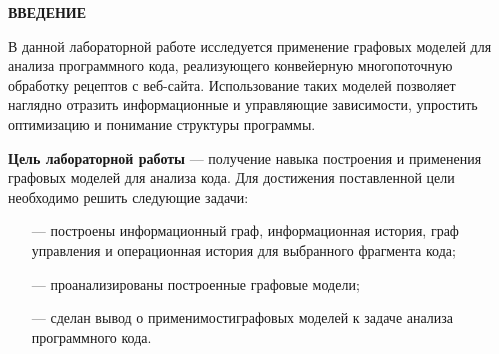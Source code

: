 \begin{center}
    \textbf{ВВЕДЕНИЕ}
\end{center}

В данной лабораторной работе исследуется применение графовых моделей для анализа программного кода, реализующего конвейерную многопоточную обработку рецептов с веб-сайта. Использование таких моделей позволяет наглядно отразить информационные и управляющие зависимости, упростить оптимизацию и понимание структуры программы.

\textbf{Цель лабораторной работы} --- получение навыка построения и применения графовых моделей для анализа кода. Для достижения поставленной цели необходимо решить следующие задачи:

\begin{itemize}
	\item[---] построены информационный граф, информационная история, граф управления и операционная история для выбранного фрагмента кода;
	\item[---] проанализированы построенные графовые модели;
    \item[---] сделан вывод о применимостиграфовых моделей к задаче анализа программного кода.
\end{itemize}